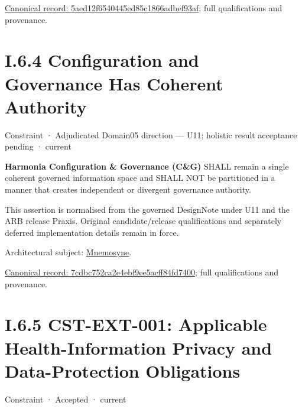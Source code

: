 {\footnotesize \href{../../../../../../../../continuum/motivation/constraint/5aed12f6540445ed85c1866adbef93af.md}{Canonical record: 5aed12f6540445ed85c1866adbef93af}; full qualifications and provenance.}\par
\section*{I.6.4 Configuration and Governance Has Coherent Authority}
\label{navigation:I.6.4}

\label{element:7cdbc752ca2e4ebf9ee5acff84fd7400}
{\small Constraint · Adjudicated Domain05 direction — U11; holistic result acceptance pending · current}\par

\textbf{Harmonia Configuration \& Governance (C\&G)} SHALL remain a single coherent governed information space and SHALL NOT be partitioned in a manner that creates independent or divergent governance authority.



This assertion is normalised from the governed DesignNote under U11 and the ARB release Praxis. Original candidate/release qualifications and separately deferred implementation details remain in force.



Architectural subject: \hyperref[element:7985e647bf9e4ca3ba70faf9e3e4ae02]{Mnemosyne}.


{\footnotesize \href{../../../../../../../../continuum/motivation/constraint/7cdbc752ca2e4ebf9ee5acff84fd7400.md}{Canonical record: 7cdbc752ca2e4ebf9ee5acff84fd7400}; full qualifications and provenance.}\par
\section*{I.6.5 CST-EXT-001: Applicable Health-Information Privacy and Data-Protection Obligations}
\label{navigation:I.6.5}

\label{element:0ed6fb9fcc9547659ce76b917881274e}
{\small Constraint · Accepted · current}\par

